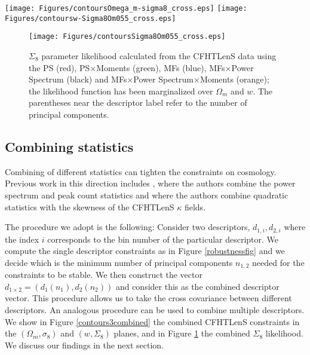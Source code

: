 \documentclass[reprint,aps,prd,superscriptaddress,showkeys,showpacs]{revtex4-1}
\begin{document}
\begin{figure*}
\begin{center}
\texttt{[image: Figures/contoursOmega\_m-sigma8\_cross.eps]}
\texttt{[image: Figures/contoursw-Sigma8Om055\_cross.eps]}
\end{center}
\caption{Combined $1\sigma$ constraints on the $(\Omega_m,\sigma_8)$ (left panel) and $(w,\Sigma_8)$ (right panel) doublets, using the PS (red), PS$\times$Moments (green), MFs (blue), MFs$\times$Power Spectrum (black) and MFs$\times$Power Spectrum$\times$Moments (orange). The likelihood function has been marginalized over $w$ (left panel) and $\Omega_m$ (right panel). The parentheses near the descriptor labels refer to the number of principal components.}
\label{contours3combined}
\end{figure*}

\begin{figure}
\begin{center}
\texttt{[image: Figures/contoursSigma8Om055\_cross.eps]}
\end{center}
\caption{$\Sigma_8$ parameter likelihood calculated from the CFHTLenS data using the PS (red), PS$\times$Moments (green), MFs (blue), MFs$\times$Power Spectrum (black) and MFs$\times$Power Spectrum$\times$Moments (orange); the likelihood function has been marginalized over $\Omega_m$ and $w$. The parentheses near the descriptor label refer to the number of principal components.}
\label{likelihoodSi8cross}
\end{figure}

\subsection{Combining statistics}
Combining of different statistics can tighten the constraints on cosmology. Previous work in this direction includes \citep{Companion}, where the authors combine the power spectrum and peak count statistics and  \citep{CFHTFu} where the authors combine quadratic statistics with the skewness of the CFHTLenS $\kappa$ fields. 

The procedure we adopt is the following:  Consider two descriptors, $d_{1,i},d_{2,i}$ where the index $i$ corresponds to the bin number of the particular descriptor. We compute the single descriptor constraints as in Figure \ref{robustnessfig} and we decide which is the minimum number of principal components $n_{1,2}$ needed for the constraints to be stable. We then construct the vector $d_{1\times2} = (d_1(n_1),d_2(n_2))$ and consider this as the combined descriptor vector. This procedure allows us to take the cross covariance between different descriptors. An analogous procedure can be used to combine multiple descriptors. We show in Figure \ref{contours3combined} the combined CFHTLenS constraints in the $(\Omega_m,\sigma_8)$ and $(w,\Sigma_8)$ planes, and in Figure \ref{likelihoodSi8cross} the combined $\Sigma_8$ likelihood. We discuss our findings in the next section. 
\end{document}
